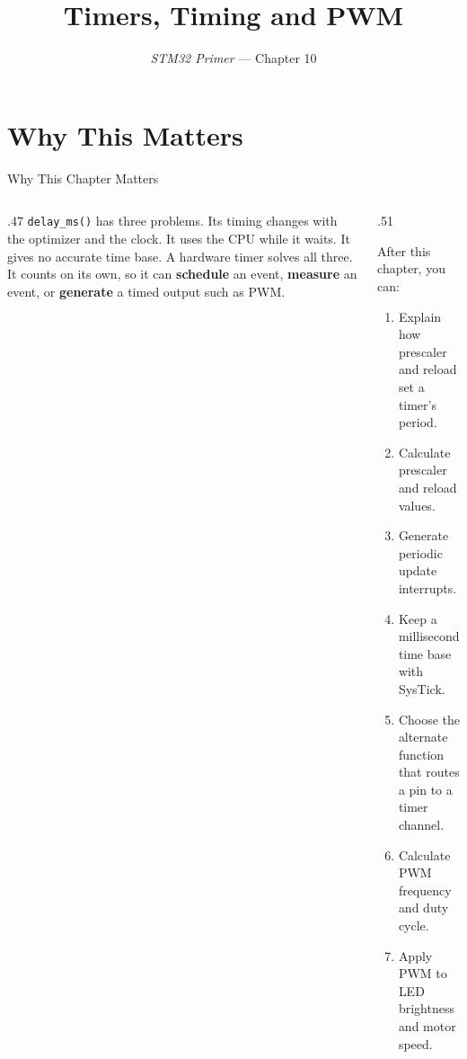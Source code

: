 \documentclass[9pt,aspectratio=169,xcolor=table]{beamer}
\title{Timers, Timing and PWM}
\subtitle{\emph{STM32 Primer} --- Chapter 10}
\begin{document}
\titlepage

\section{Why This Matters}

\begin{frame}{Why This Chapter Matters}
    \begin{columns}[T]
    \begin{column}{.47\textwidth}
        {\normalsize \texttt{delay\_ms()} has three problems. Its timing changes with the optimizer and the clock. It uses the CPU while it waits. It gives no accurate time base. A hardware timer solves all three. It counts on its own, so it can \textbf{schedule} an event, \textbf{measure} an event, or \textbf{generate} a timed output such as PWM.}
    \end{column}
    \begin{column}{.51\textwidth}
        \begin{block}{After this chapter, you can:}
        {\small
        \begin{enumerate}\itemsep2pt
            \item Explain how prescaler and reload set a timer's period.
            \item Calculate prescaler and reload values.
            \item Generate periodic update interrupts.
            \item Keep a millisecond time base with SysTick.
            \item Choose the alternate function that routes a pin to a timer channel.
            \item Calculate PWM frequency and duty cycle.
            \item Apply PWM to LED brightness and motor speed.
        \end{enumerate}}
        \end{block}
    \end{column}
    \end{columns}
\end{frame}
\end{document}
